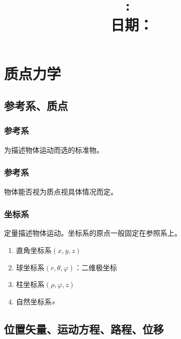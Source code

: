 \documentclass[12pt, a4paper]{article}
\title{
    \vspace{2in}
    \textmd{\textbf{\hmwkClass:\ \hmwkTitle}}\\
    \normalsize\vspace{0.1in}\small{日期： \hmwkDueDate}\\
    \vspace{0.1in}\large{\textit{\myUniversiy}}
    \vspace{3in}
}
\author{\hmwkAuthorName}
\date{}
\begin{document}
\maketitle

\pagebreak


\tableofcontents

\pagebreak


\pagebreak

\section{质点力学}

\subsection{参考系、质点}

\subsubsection{参考系}

    为描述物体运动而选的标准物。

\subsubsection{参考系}

    物体能否视为质点视具体情况而定。

\subsubsection{坐标系}

    定量描述物体运动。坐标系的原点一般固定在参照系上。

    \begin{enumerate}
        \item 直角坐标系\(\left(x,y,z\right)\)
        \item 球坐标系\(\left(r,\theta,\varphi\right)\)：二维极坐标
        \item 柱坐标系\(\left(\rho,\varphi,z\right)\)
        \item 自然坐标系\(s\)
    \end{enumerate}

\subsection{位置矢量、运动方程、路程、位移}
\end{document}

